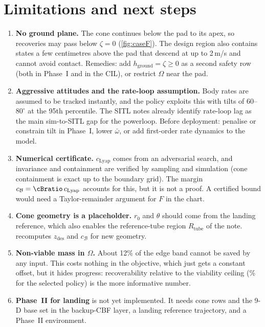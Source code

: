 \documentclass[11pt,a4paper]{article}
\newcommand{\B}{\mathcal{B}}
\newcommand{\zd}{z_{\mathrm{des}}}
\begin{document}
\section{Limitations and next steps}\label{sec:limitations}

\begin{enumerate}
\item \textbf{No ground plane.} The cone continues below the pad to its apex, so recoveries may pass below
$\zeta=0$ (\cref{fig:caseF}). The design region also contains states a few centimetres above the pad that
descend at up to 2\,m/s and cannot avoid contact. Remedies: add $h_{\mathrm{ground}}=\zeta\ge0$ as a second
safety row (both in Phase~I and in the CIL), or restrict $\Omega$ near the pad.
\item \textbf{Aggressive attitudes and the rate-loop assumption.} Body rates are assumed to be tracked
instantly, and the policy exploits this with tilts of $60$--$80^\circ$ at the 95th percentile. The SITL
notes already identify rate-loop lag as the main sim-to-SITL gap for the powerloop. Before deployment:
penalise or constrain tilt in Phase~I, lower $\bar\omega$, or add first-order rate dynamics to the model.
\item \textbf{Numerical certificate.} $c_{\mathrm{Lyap}}$ comes from an adversarial search, and invariance
and containment are verified by sampling and simulation (cone containment is exact up to the boundary grid).
The margin $c_{\B}=\cBratio\,c_{\mathrm{Lyap}}$ accounts for this, but it is not a proof. A certified
bound would need a Taylor-remainder argument for $F$ in the chart.
\item \textbf{Cone geometry is a placeholder.} $r_0$ and $\theta$ should come from the landing reference,
which also enables the reference-tube region $R_{\mathrm{tube}}$ of the note.
 recomputes $\zd$ and $c_{\B}$ for new geometry.
\item \textbf{Non-viable mass in $\Omega$.} About 12\% of the edge band cannot be saved by any input. This
costs nothing in the objective, which just gets a constant offset, but it hides progress: recoverability relative
to the viability ceiling (\fracOfCeil\% for the selected policy) is the more informative number.
\item \textbf{Phase~II for landing} is not yet implemented. It needs cone rows and the 9-D base set in
the backup-CBF layer, a landing reference trajectory, and a Phase~II environment.
\end{enumerate}
\end{document}
